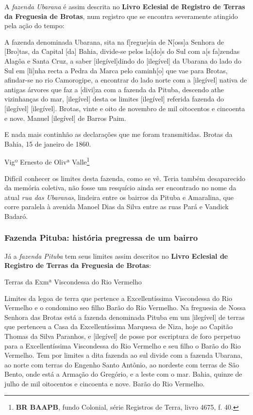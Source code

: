 \begin{citacao}
A \textit{fazenda Ubarana} é assim descrita no \textbf{Livro Eclesial de Registro de Terras da Freguesia de Brotas}, num registro que se encontra severamente atingido pela ação do tempo:

\begin{citacao}
A fazenda denominada Ubarana, sita na f[regue]sia de N[oss]a Senhora de [Bro]tas, da Capital [da] Bahia, divide-se pelos la[do]s do Sul com a[s fa]zendas Alagôa e Santa Cruz, a saber [ilegível]dindo do [ilegível] da Ubarana do lado do Sul em [li]nha recta a Pedra da Marca pelo caminh[o] que vae para Brotas, afindar-se no rio Camorogipe, a encontrar do lado norte com a [ilegível] nativa de antigas árvores que faz a [divi]za com a fazenda da Pituba, descendo athe vizinhanças do mar, [ilegível] desta os limites [ilegível] referida fazenda do [ilegível] [ilegível]. Brotas, vinte e oito de novembro de mil oitocentos e cincoenta e nove. Manuel [ilegível] de Barros Paim.

E nada mais continhão as declarações que me foram transmitidas. Brotas da Bahia, 15 de janeiro de 1860.

Vigº Ernesto de Olivª Valle\footnote{\textbf{BR BAAPB}, fundo Colonial, série Registros de Terra, livro 4675, f. 40.}
\end{citacao}

Difícil conhecer os limites desta fazenda, como se vê. Teria também desaparecido da memória coletiva, não fosse um resquício ainda ser encontrado no nome da atual \textit{rua das Ubaranas}, lindeira entre os bairros da Pituba e Amaralina, que corre paralela à avenida Manoel Dias da Silva entre as ruas Pará e Vandick Badaró.

\subsubsection{Fazenda Pituba: história pregressa de um bairro}

Já a \textit{fazenda Pituba} tem seus limites assim descritos no \textbf{Livro Eclesial de Registro de Terras da Freguesia de Brotas}:

\begin{citacao}
Terras da Exmª Viscondessa do Rio Vermelho

Limites da legoa de terra que pertence a Excellentíssima Viscondessa do Rio Vermelho e o condomino seo filho Barão do Rio Vermelho. Na freguesia de Nossa Senhora das Brotas está a fazenda denominada Pituba em um [ilegível] de terras que pertenceu a Casa da Excellentíssima Marquesa de Niza, hoje ao Capitão Thomas da Silva Paranhos, e [ilegível] de posse por escriptura de foro perpetuo para a Excellentíssima Viscondessa do Rio Vermelho e seu filho o Barão do Rio Vermelho. Tem por limites a dita fazenda ao sul divide com a fazenda Ubarana, ao norte com terras do Engenho Santo Antônio, ao nordeste com terras de São Bento, onde está a Armação do Gregório, e a leste com o mar. Bahia, quinze de julho de mil oitocentos e cincoenta e nove. Barão do Rio Vermelho.


\end{citacao}
\end{citacao}
